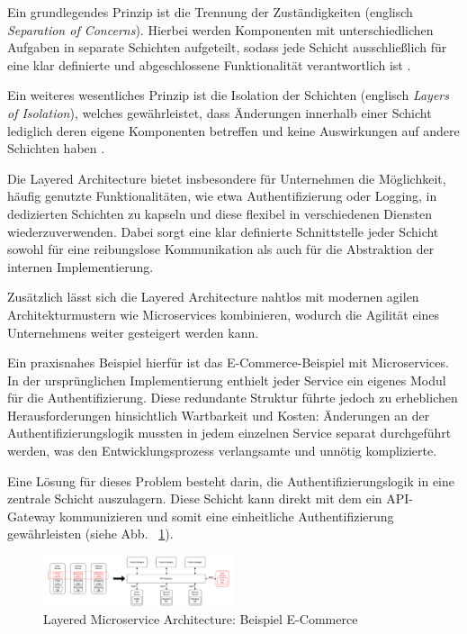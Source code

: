 \documentclass[acmtog]{acmart}
\begin{document}
Ein grundlegendes Prinzip ist die Trennung der Zuständigkeiten (englisch \textit{Separation
of Concerns}). Hierbei werden Komponenten mit unterschiedlichen Aufgaben in separate Schichten
aufgeteilt, sodass jede Schicht ausschließlich für eine klar definierte und abgeschlossene
Funktionalität verantwortlich ist \cite[34]{layered2}.

Ein weiteres wesentliches Prinzip ist die Isolation der Schichten (englisch \textit{Layers
of Isolation}), welches gewährleistet, dass Änderungen innerhalb einer Schicht lediglich
deren eigene Komponenten betreffen und keine Auswirkungen auf andere Schichten haben \cite[3–4]{layered}.

Die Layered Architecture bietet insbesondere für Unternehmen die Möglichkeit, häufig genutzte
Funktionalitäten, wie etwa Authentifizierung oder Logging, in dedizierten Schichten zu kapseln
und diese flexibel in verschiedenen Diensten wiederzuverwenden. Dabei sorgt eine klar definierte
Schnittstelle jeder Schicht sowohl für eine reibungslose Kommunikation als auch für die
Abstraktion der internen Implementierung.

Zusätzlich lässt sich die Layered Architecture nahtlos mit modernen agilen Architekturmustern
wie Microservices kombinieren, wodurch die Agilität eines Unternehmens weiter gesteigert werden
kann.

Ein praxisnahes Beispiel hierfür ist das E-Commerce-Beispiel mit Microservices.
In der ursprünglichen Implementierung enthielt jeder Service ein eigenes Modul für die Authentifizierung. Diese
redundante Struktur führte jedoch zu erheblichen Herausforderungen hinsichtlich Wartbarkeit
und Kosten: Änderungen an der Authentifizierungslogik mussten in jedem einzelnen Service separat
durchgeführt werden, was den Entwicklungsprozess verlangsamte und unnötig komplizierte.

Eine Lösung für dieses Problem besteht darin, die Authentifizierungslogik in eine zentrale
Schicht auszulagern.
Diese Schicht kann direkt mit dem ein API-Gateway kommunizieren
und somit eine einheitliche Authentifizierung gewährleisten (siehe Abb. ~\ref{fig:layered}).

\begin{figure}[h!]
    \centering
    \includegraphics[width=0.5\textwidth]{images/layered/ecommerce-example}
    \caption{Layered Microservice Architecture: Beispiel E-Commerce}
    \label{fig:layered}
\end{figure}
\end{document}
